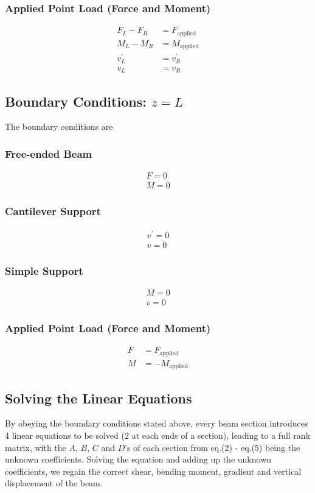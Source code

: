 \documentclass[11pt,a4paper]{article}
\begin{document}
\subsubsection*{Applied Point Load (Force and Moment)}
\begin{align}
	F_{L} - F_{R} &= F_{\text{applied}} \\
	M_{L} - M_{R} &= M_{\text{applied}}	\\
	v_{L}^{'} &= v_{R}^{'} \\
	v_{L} &= v_{R}
\end{align}
\subsection{Boundary Conditions: $z = L$}
The boundary conditions are
\subsubsection*{Free-ended Beam}
\begin{align}
	F = 0 \\
	M = 0
\end{align}
\subsubsection*{Cantilever Support}
\begin{align}
	v^{'} = 0 \\
	v = 0
\end{align}
\subsubsection*{Simple Support}
\begin{align}
	M = 0 \\
	v = 0
\end{align}
\subsubsection*{Applied Point Load (Force and Moment)}
\begin{align}
	F &= F_{\text{applied}} \\
	M &= -M_{\text{applied}}
\end{align}
\subsection{Solving the Linear Equations}
By obeying the boundary conditions stated above, every beam section introduces 4 linear equations to be solved (2 at each ends of a section), leading to a full rank matrix, with the $A$, $B$, $C$ and $D$'s of each section from eq.(2) - eq.(5) being the unknown coefficients. Solving the equation and adding up the unknown coefficients, we regain the correct shear, bending moment, gradient and vertical displacement of the beam.
\end{document}

